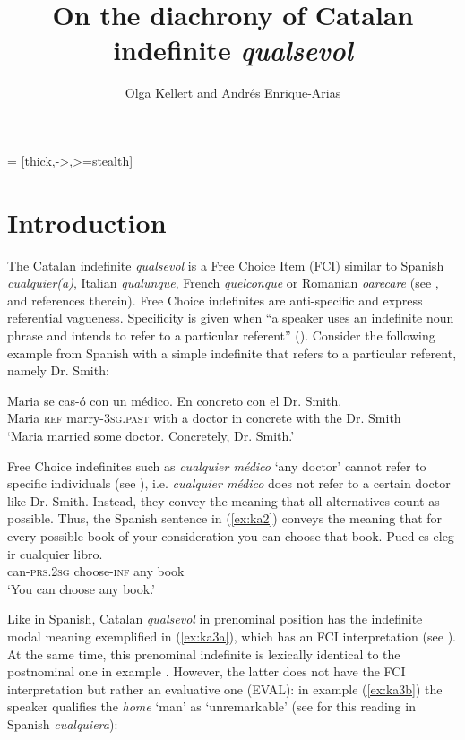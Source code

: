 \documentclass[output=paper,colorlinks,citecolor=brown]{langscibook}
\author{Olga Kellert\orcid{}\affiliation{University of Göttingen} and Andrés Enrique-Arias\orcid{}\affiliation{University of the Balearic Islands}}
\title{On the diachrony of Catalan indefinite \textit{qualsevol}}
\begin{document}
 = [thick,->,>=stealth]
\maketitle

\section{Introduction} 

The Catalan indefinite \textit{qualsevol} is a Free Choice Item (FCI) similar to Spanish \textit{cualquier(a)}, Italian \textit{qualunque}, French \textit{quelconque} or Romanian \textit{oarecare} (see \cite{Alonietal2010}, and references therein). Free Choice indefinites are anti-specific and express referential vagueness. Specificity is given when “a speaker uses an indefinite noun phrase and intends to refer to a particular referent” (\citealt[][10]{Heusinger2011}). Consider the following example from Spanish with a simple indefinite that refers to a particular referent, namely Dr. Smith:

\ea \label{ex:ka1}
\gll Maria se cas-ó con un médico. En concreto con el Dr. Smith.\\
Maria \textsc{ref} marry-3\textsc{sg.past} with a doctor in concrete with the Dr. Smith\\
\glt ‘Maria married some doctor. Concretely, Dr. Smith.’\\
\z

Free Choice indefinites such as \textit{cualquier médico} ‘any doctor’ cannot refer to specific individuals (see \citealt{Alonso-OvalleMenéndez-Benito2010}), i.e. \textit{cualquier médico} does not refer to a certain doctor like Dr. Smith. Instead, they convey the meaning that all alternatives count as possible. Thus, the Spanish sentence in (\ref{ex:ka2}) conveys the meaning that for every possible book of your consideration you can choose that book.
\ea \label{ex:ka2}
\gll Pued-es eleg-ir cualquier libro.\\
    can-\textsc{prs.2sg} choose-\textsc{inf} any book\\
\glt ‘You can choose any book.’\\
\z

Like in Spanish, Catalan \textit{qualsevol} in prenominal position has the indefinite modal meaning exemplified in (\ref{ex:ka3a}), which has an FCI interpretation (see \cites[29]{Alonso-OvalleMenéndez-Benito2010}[]{Rivero2011}). At the same time, this prenominal indefinite is lexically identical to the postnominal one in example . However, the latter does not have the FCI interpretation but rather an evaluative one (EVAL): in example (\ref{ex:ka3b}) the speaker qualifies the \textit{home} ‘man’ as ‘unremarkable’ (see \cites[29]{Alonso-OvalleMenéndez-Benito2010}[]{Rivero2011} for this reading in Spanish \textit{cualquiera}):\largerpage
\end{document}
